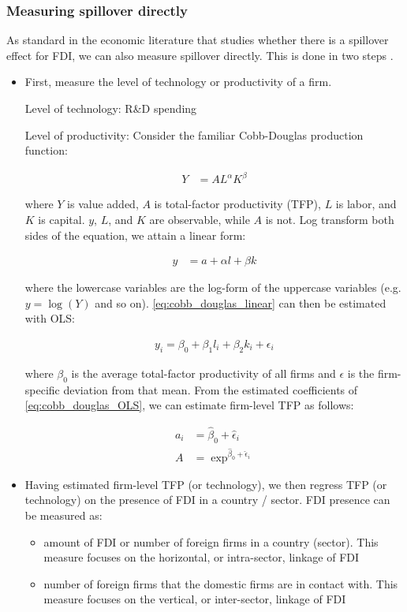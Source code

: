 \subsubsection*{Measuring spillover directly}

As standard in the economic literature that studies whether there is a spillover effect for FDI, we can also measure spillover directly. This is done in two steps \citep{VanBeveren2012}.

\begin{itemize}
\item First, measure the level of technology or productivity of a firm.

Level of technology: R\&D spending

Level of productivity: Consider the familiar Cobb-Douglas production function:

\begin{align}
Y &= AL^{\alpha}K^{\beta}
\end{align}

where $Y$ is value added, $A$ is total-factor productivity (TFP), $L$ is labor, and $K$ is capital. $y$, $L$, and $K$ are observable, while $A$ is not. Log transform both sides of the equation, we attain a linear form:

\begin{align} \label{eq:cobb_douglas_linear}
y &= a + \alpha l + \beta k
\end{align}

where the lowercase variables are the log-form of the uppercase variables (e.g. $y = \log(Y)$ and so on). \autoref{eq:cobb_douglas_linear} can then be estimated with OLS:

\begin{align} \label{eq:cobb_douglas_OLS}
y_i = \beta_0 + \beta_1 l_i + \beta_2 k_i + \epsilon_i
\end{align} 

where $\beta_0$ is the average total-factor productivity of all firms and $\epsilon$ is the firm-specific deviation from that mean. From the estimated coefficients of \autoref{eq:cobb_douglas_OLS}, we can estimate firm-level TFP as follows:

\begin{align}
a_i &= \hat\beta_0 + \hat\epsilon_i \\
A &= \exp^{\hat\beta_0 + \hat\epsilon_i}
\end{align}

\item Having estimated firm-level TFP (or technology), we then regress TFP (or technology) on the presence of FDI in a country / sector. FDI presence can be measured as:
\begin{itemize}
\item amount of FDI or number of foreign firms in a country (sector). This measure focuses on the horizontal, or intra-sector, linkage of FDI
\item number of foreign firms that the domestic firms are in contact with. This measure focuses on the vertical, or inter-sector, linkage of FDI
\end{itemize}
\end{itemize}

